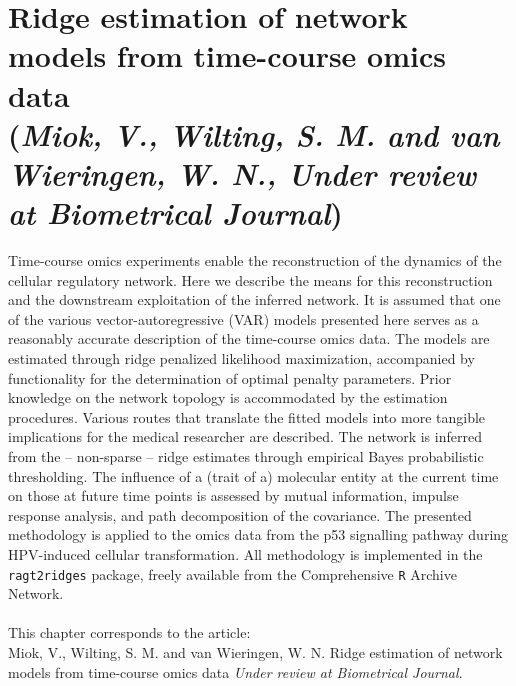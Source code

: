 \chapter{Ridge estimation of network models from time-course omics data \\ {\footnotesize(\textit{Miok, V., Wilting, S. M. and van Wieringen, W. N., Under review at Biometrical Journal})}}
\label{chapter:Window estimator}

\graphicspath{{Chapter4/Figs/}{Chapter4/Figs/PDF/}{Chapter4/Figs/}}%

Time-course omics experiments enable the reconstruction of the dynamics of the cellular regulatory network. Here we describe the means for this reconstruction and the downstream exploitation of the inferred network. It is assumed that one of the various vector-autoregressive (VAR) models presented here serves as a reasonably accurate description of the time-course omics data. The models are estimated through ridge penalized likelihood maximization, accompanied by functionality for the determination of optimal penalty parameters. Prior knowledge on the network topology is accommodated by the estimation procedures. Various routes that translate the fitted models into more tangible implications for the medical researcher are described. The network is inferred from the -- non-sparse -- ridge estimates through empirical Bayes probabilistic thresholding. The influence of a (trait of a) molecular entity at the current time on those at future time points is assessed by mutual information, impulse response analysis, and path decomposition of the covariance. The presented methodology is applied to the omics data from the p53 signalling pathway during HPV-induced cellular transformation. All methodology is implemented in the \texttt{ragt2ridges} package, freely available from the Comprehensive {\tt R} Archive Network.
\\
\\
This chapter corresponds to the article:\\
 Miok, V., Wilting, S. M. and van Wieringen, W. N. Ridge estimation of network models from time-course omics data \textit{Under review at Biometrical Journal}.



